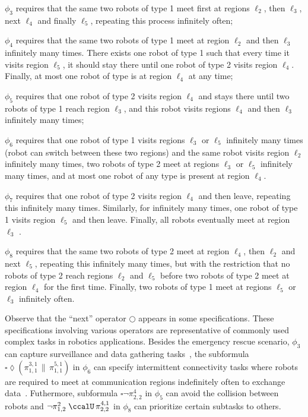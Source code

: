 \documentclass[Afour,sageh,times]{sagej}
\renewcommand{\ap}[3]{\mathcal{\pi}_{{#1},{#2}}^{#3}}
\begin{document}
{{$\phi_3$ requires that the same two robots of type 1 meet first at regions $\ell_2$, then  $\ell_3$, next  $\ell_4$ and finally $\ell_5$, repeating this process infinitely often;

$\phi_4$ requires that the same two robots of type 1 meet at region $\ell_2$ and then $\ell_3$ infinitely many times. There exists one robot of type 1 such that every time  it visits region $\ell_5$, it should stay there until one robot of type 2 visits region $\ell_4$. Finally, at most one robot of type is at region $\ell_4$ at any time;

$\phi_5$ requires that one robot of type 2 visits region $\ell_4$ and stays there until two robots of type 1 reach region $\ell_3$, and this robot visits regions $\ell_4$ and then $\ell_3$ infinitely many times;

$\phi_6$ requires that one robot of type 1 visits regions $\ell_3$ or $\ell_5$ infinitely many times (robot can switch between these two regions) and the same robot visits region $\ell_2$ infinitely many times, two robots of type 2 meet at regions $\ell_3$ or $\ell_5$ infinitely many times, and at most one robot of any type is present at region $\ell_4$.

$\phi_7$ requires that one robot of type 2 visits region $\ell_4$ and then leave, repeating this infinitely many times. Similarly, for infinitely many times, one robot of type 1 visits region $\ell_5$ and then leave. Finally, all robots eventually meet at region $\ell_3$ .

$\phi_8$ requires that the same two robots of type 2 meet at region $\ell_4$, then $\ell_2$ and next $\ell_5$, repeating this infinitely many times, but with the restriction that no robots of type 2 reach regions $\ell_2$ and $\ell_5$ before two robots of type 2 meet at region $\ell_4$ for the first time. Finally, two robots of type 1 meet at regions $\ell_5$ or $\ell_3$ infinitely often.

Observe that the ``next''  operator $\bigcirc$ appears in some specifications. These  specifications  involving various operators are representative of commonly used complex tasks in robotics applications. Besides the emergency rescue scenario, $\phi_3$ can capture surveillance and data gathering tasks~\citep{smith2011optimal,guo2017distributed}, the subformula $\square \lozenge (\ap{1}{1}{3,1} \,\|\, \ap{1}{1}{5,1})$ in $\phi_6$ can specify intermittent connectivity tasks where robots are required to meet at communication regions indefinitely often to exchange data~\citep{kantaros2018distributed}. Futhermore, subformula $\square \neg \ap{2}{2}{4}$ in $\phi_5$ can avoid the collision between robots and $\neg \ap{1}{2}{2} \;\ccalU \, \ap{2}{2}{4,1}$ in $\phi_8$ can  prioritize certain subtasks to others.

}}
\end{document}
